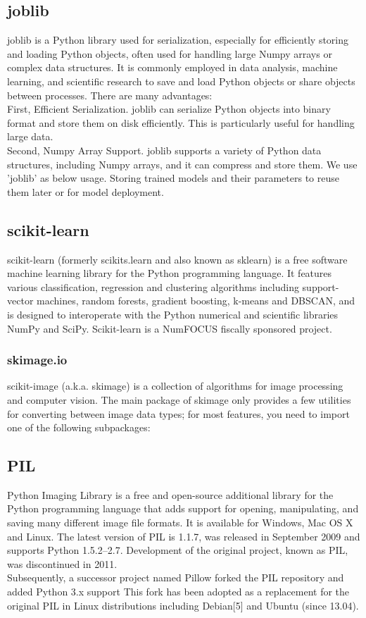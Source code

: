 \subsection{\textbf{joblib}}
joblib is a Python library used for serialization, especially for efficiently storing and loading Python objects, often used for handling large Numpy arrays or complex data structures. It is commonly employed in data analysis, machine learning, and scientific research to save and load Python objects or share objects between processes. There are many advantages: \\
First, Efficient Serialization. joblib can serialize Python objects into binary format and store them on disk efficiently. This is particularly useful for handling large data.
\\Second, Numpy Array Support. joblib supports a variety of Python data structures, including Numpy arrays, and it can compress and store them. We use 'joblib' as below usage. Storing trained models and their parameters to reuse them later or for model deployment. \\

\subsection{\textbf{scikit-learn}}
\cite{scikit-learn}
scikit-learn (formerly scikits.learn and also known as sklearn) is a free software machine learning library for the Python programming language. It features various classification, regression and clustering algorithms including support-vector machines, random forests, gradient boosting, k-means and DBSCAN, and is designed to interoperate with the Python numerical and scientific libraries NumPy and SciPy. Scikit-learn is a NumFOCUS fiscally sponsored project.\\
\subsubsection{\textbf{skimage.io}}
scikit-image (a.k.a. skimage) is a collection of algorithms for image processing and computer vision.
The main package of skimage only provides a few utilities for converting between image data types; for most features, you need to import one of the following subpackages:\\
\subsection{\textbf{PIL}}
\cite{PIL}
Python Imaging Library is a free and open-source additional library for the Python programming language that adds support for opening, manipulating, and saving many different image file formats. It is available for Windows, Mac OS X and Linux. The latest version of PIL is 1.1.7, was released in September 2009 and supports Python 1.5.2–2.7. Development of the original project, known as PIL, was discontinued in 2011.\\
Subsequently, a successor project named Pillow forked the PIL repository and added Python 3.x support This fork has been adopted as a replacement for the original PIL in Linux distributions including Debian[5] and Ubuntu (since 13.04).\\
